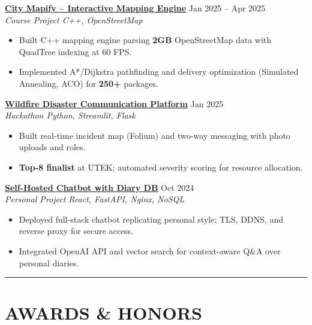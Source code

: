 \documentclass[letterpaper,10pt]{article}
\begin{document}
\vspace{0.15cm}
\noindent\href{https://github.com/Ken-2511/city-mapify}{\uline{\textbf{City Mapify – Interactive Mapping Engine}}} \hfill Jan 2025 -- Apr 2025\\
\textit{Course Project \textbar{} C++, OpenStreetMap}
\begin{itemize}
	\item Built C++ mapping engine parsing \textbf{2GB} OpenStreetMap data with QuadTree indexing at 60 FPS.
	\item Implemented A*/Dijkstra pathfinding and delivery optimization (Simulated Annealing, ACO) for \textbf{250+} packages.
\end{itemize}

\vspace{0.15cm}
\noindent\href{https://github.com/Ken-2511/utek_disaster_communication_system}{\uline{\textbf{Wildfire Disaster Communication Platform}}} \hfill Jan 2025\\
\textit{Hackathon \textbar{} Python, Streamlit, Flask}
\begin{itemize}
    \item Built real-time incident map (Folium) and two-way messaging with photo uploads and roles.
    \item \textbf{Top-8 finalist} at UTEK; automated severity scoring for resource allocation.
\end{itemize}

\vspace{0.15cm}
\noindent\href{https://chengyongkang.me/chat}{\uline{\textbf{Self-Hosted Chatbot with Diary DB}}} \hfill Oct 2024\\
\textit{Personal Project \textbar{} React, FastAPI, Nginx, NoSQL}
\begin{itemize}
    \item Deployed full-stack chatbot replicating personal style; TLS, DDNS, and reverse proxy for secure access.
    \item Integrated OpenAI API and vector search for context-aware Q\&A over personal diaries.
\end{itemize}

\noindent\rule{\linewidth}{1pt}

\section*{\textbf{AWARDS \& HONORS}}
\end{document}
